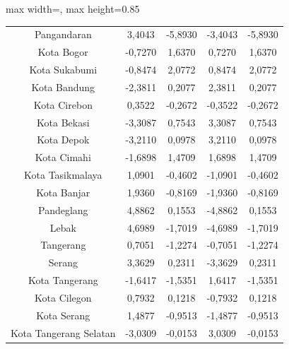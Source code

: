 \begin{table}[H]
\begin{adjustbox}{max width=\textwidth, max height=0.85\textheight}
\begin{tabular}{|c|c|c|c|c|}
Pangandaran & 3,4043 & -5,8930 & -3,4043 & -5,8930 \\
Kota Bogor & -0,7270 & 1,6370 & 0,7270 & 1,6370 \\
Kota Sukabumi & -0,8474 & 2,0772 & 0,8474 & 2,0772 \\
Kota Bandung & -2,3811 & 0,2077 & 2,3811 & 0,2077 \\
Kota Cirebon & 0,3522 & -0,2672 & -0,3522 & -0,2672 \\
Kota Bekasi & -3,3087 & 0,7543 & 3,3087 & 0,7543 \\
Kota Depok & -3,2110 & 0,0978 & 3,2110 & 0,0978 \\
Kota Cimahi & -1,6898 & 1,4709 & 1,6898 & 1,4709 \\
Kota Tasikmalaya & 1,0901 & -0,4602 & -1,0901 & -0,4602 \\
Kota Banjar & 1,9360 & -0,8169 & -1,9360 & -0,8169 \\
Pandeglang & 4,8862 & 0,1553 & -4,8862 & 0,1553 \\
Lebak & 4,6989 & -1,7019 & -4,6989 & -1,7019 \\
Tangerang & 0,7051 & -1,2274 & -0,7051 & -1,2274 \\
Serang & 3,3629 & 0,2311 & -3,3629 & 0,2311 \\
Kota Tangerang & -1,6417 & -1,5351 & 1,6417 & -1,5351 \\
Kota Cilegon & 0,7932 & 0,1218 & -0,7932 & 0,1218 \\
Kota Serang & 1,4877 & -0,9513 & -1,4877 & -0,9513 \\
Kota Tangerang Selatan & -3,0309 & -0,0153 & 3,0309 & -0,0153 \\
\hline
\end{tabular}
\end{adjustbox}
\end{table}